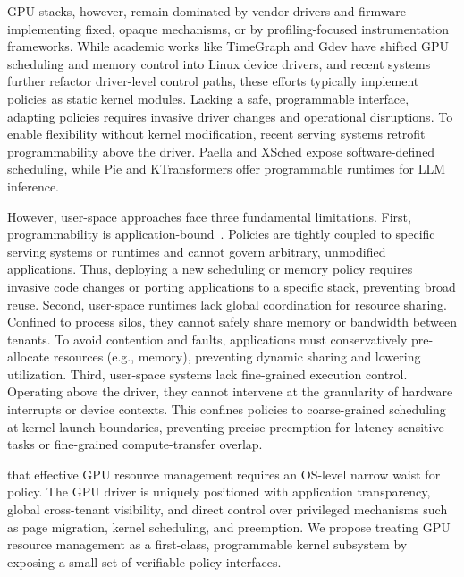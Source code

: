 GPU stacks, however, remain dominated by vendor drivers and firmware implementing fixed, opaque mechanisms, or by profiling-focused instrumentation frameworks\cite{cupti,villa2019nvbit,neutrino,egpu}. 
While academic works like TimeGraph and Gdev have shifted GPU scheduling and memory control into Linux device drivers\cite{timegraph,gdev}, and recent systems further refactor driver-level control paths\cite{kernelintercept,gpreempt,lithos}, these efforts typically implement policies as static kernel modules. Lacking a safe, programmable interface, adapting policies requires invasive driver changes and operational disruptions. To enable flexibility without kernel modification, recent serving systems retrofit programmability above the driver.  Paella\cite{paella} and XSched\cite{xsched} expose software-defined scheduling, while Pie\cite{pie} and KTransformers\cite{ktransformers} offer programmable runtimes for LLM inference. 

However, user-space approaches face three fundamental limitations. First, programmability is application-bound~\cite{ng2023paella}. Policies are tightly coupled to specific serving systems or runtimes and cannot govern arbitrary, unmodified applications. Thus, deploying a new scheduling or memory policy requires invasive code changes or porting applications to a specific stack, preventing broad reuse. Second, user-space runtimes lack global coordination for resource sharing. Confined to process silos, they cannot safely share memory or bandwidth between tenants. To avoid contention and faults, applications must conservatively pre-allocate resources (e.g., memory), preventing dynamic sharing and lowering utilization. Third, user-space systems lack fine-grained execution control. Operating above the driver, they cannot intervene at the granularity of hardware interrupts or device contexts. This confines policies to coarse-grained scheduling at kernel launch boundaries, preventing precise preemption for latency-sensitive tasks or fine-grained compute-transfer overlap.

 that effective GPU resource management requires an OS-level narrow waist for policy. The GPU driver is uniquely positioned with application transparency, global cross-tenant visibility, and direct control over privileged mechanisms such as page migration, kernel scheduling, and preemption. We propose treating GPU resource management as a first-class, programmable kernel subsystem by exposing a small set of verifiable policy interfaces. 


